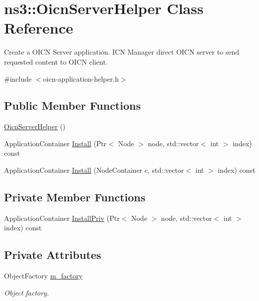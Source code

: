 \hypertarget{classns3_1_1OicnServerHelper}{\section{ns3\-:\-:Oicn\-Server\-Helper Class Reference}
\label{classns3_1_1OicnServerHelper}
}


Create a O\-I\-C\-N Server application. I\-C\-N Manager direct O\-I\-C\-N server to send requested content to O\-I\-C\-N client.  




{\ttfamily \#include $<$oicn-\/application-\/helper.\-h$>$}

\subsection*{Public Member Functions}
\begin{DoxyCompactItemize}
\item 
\hyperlink{classns3_1_1OicnServerHelper_a998b6d70d51296b555b21db53495fa06}{Oicn\-Server\-Helper} ()
\item 
Application\-Container \hyperlink{classns3_1_1OicnServerHelper_a4b67e200abe0195e41e9d90fe7d39bbd}{Install} (Ptr$<$ Node $>$ node, std\-::vector$<$ int $>$ index) const 
\item 
Application\-Container \hyperlink{classns3_1_1OicnServerHelper_aea4f4451e7c402188d9420bd1651d353}{Install} (Node\-Container c, std\-::vector$<$ int $>$ index) const 
\end{DoxyCompactItemize}
\subsection*{Private Member Functions}
\begin{DoxyCompactItemize}
\item 
Application\-Container \hyperlink{classns3_1_1OicnServerHelper_ab941edf2e4f5d21a605234c5641c389e}{Install\-Priv} (Ptr$<$ Node $>$ node, std\-::vector$<$ int $>$ index) const 
\end{DoxyCompactItemize}
\subsection*{Private Attributes}
\begin{DoxyCompactItemize}
\item 
Object\-Factory \hyperlink{classns3_1_1OicnServerHelper_a19cdffceba4d5dfc156b3f1bf18e2531}{m\-\_\-factory}
\begin{DoxyCompactList}\small\item\em Object factory. \end{DoxyCompactList}\end{DoxyCompactItemize}



